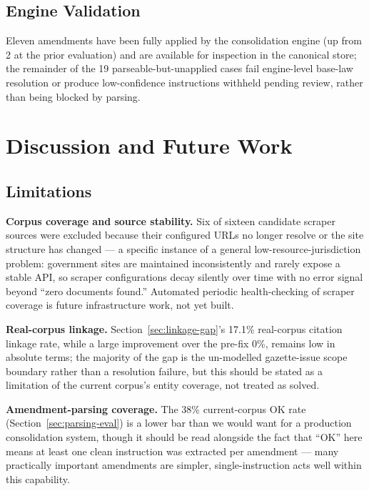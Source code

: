 \documentclass{IOS-Book-Article}
\begin{document}
\subsection{Engine Validation}

Eleven amendments have been fully applied by the consolidation engine (up from 2 at the
prior evaluation) and are available for inspection in the canonical store; the remainder of
the 19 parseable-but-unapplied cases fail engine-level base-law resolution or produce
low-confidence instructions withheld pending review, rather than being blocked by parsing.

\section{Discussion and Future Work}
\label{sec:discussion}

\subsection{Limitations}
\label{sec:limitations}

\textbf{Corpus coverage and source stability.} Six of sixteen candidate scraper sources were
excluded because their configured URLs no longer resolve or the site structure has changed
--- a specific instance of a general low-resource-jurisdiction problem: government sites are
maintained inconsistently and rarely expose a stable API, so scraper configurations decay
silently over time with no error signal beyond ``zero documents found.'' Automated periodic
health-checking of scraper coverage is future infrastructure work, not yet built.

\textbf{Real-corpus linkage.} Section~\ref{sec:linkage-gap}'s 17.1\% real-corpus citation linkage rate, while a large
improvement over the pre-fix 0\%, remains low in absolute terms; the majority of the gap is
the un-modelled gazette-issue scope boundary rather than a resolution failure, but this
should be stated as a limitation of the current corpus's entity coverage, not treated as
solved.

\textbf{Amendment-parsing coverage.} The 38\% current-corpus OK rate (Section~\ref{sec:parsing-eval}) is a lower bar
than we would want for a production consolidation system, though it should be read alongside
the fact that ``OK'' here means at least one clean instruction was extracted per amendment ---
many practically important amendments are simpler, single-instruction acts well within this
capability.
\end{document}
